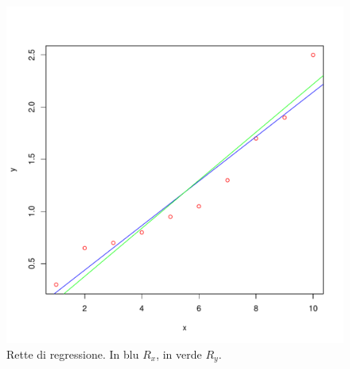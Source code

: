\documentclass[onecolumn,12pt]{book}\usepackage[]{graphicx}\usepackage[]{color}
\makeatletter
\def\maxwidth{ %
  \ifdim\Gin@nat@width>\linewidth
    \linewidth
  \else
    \Gin@nat@width
  \fi
}
\newenvironment{knitrout}{}{} %
\makeatother
\begin{document}
\begin{center}
\begin{figure}[htbp]
\begin{knitrout}
\color{fgcolor}
\includegraphics[width=\maxwidth]{figure/unnamed-chunk-118-1} 

\end{knitrout}
\caption{Rette di regressione. In blu $R_x$, in verde $R_y$.}
\label{fig:duerettex}
\end{figure}
\end{center}
\end{document}

